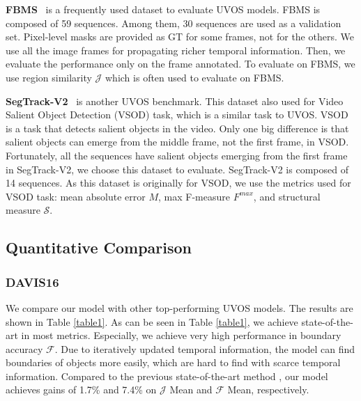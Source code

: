 \documentclass[letterpaper]{article} \usepackage{aaai22}  \usepackage{times}  \usepackage{helvet}  \usepackage{courier}  \usepackage[hyphens]{url}  \usepackage{graphicx} \urlstyle{rm} \def\UrlFont{\rm}  \usepackage{natbib}  \usepackage{caption} \DeclareCaptionStyle{ruled}{labelfont=normalfont,labelsep=colon,strut=off} \frenchspacing  \setlength{\pdfpagewidth}{8.5in}  \setlength{\pdfpageheight}{11in}  \usepackage{algorithm}
\renewcommand{\paragraph}[1]{\vspace{1mm}\noindent\textbf{#1}}
\begin{document}
\paragraph{FBMS}~\citep{ochs2013segmentation} is a frequently used dataset to evaluate UVOS models. FBMS is composed of 59 sequences. Among them, 30 sequences are used as a validation set. Pixel-level masks are provided as GT for some frames, not for the others. We use all the image frames for propagating richer temporal information. Then, we evaluate the performance only on the frame annotated. To evaluate on FBMS, we use region similarity $\mathcal{J}$ which is often used to evaluate on FBMS. 

\paragraph{SegTrack-V2}~\citep{li2013video} is another UVOS benchmark.
This dataset also used for Video Salient Object Detection (VSOD) task, which is a similar task to UVOS. VSOD is a task that detects salient objects in the video. Only one big difference is that salient objects can emerge from the middle frame, not the first frame, in VSOD. Fortunately, all the sequences have salient objects emerging from the first frame in SegTrack-V2, we choose this dataset to evaluate. SegTrack-V2 is composed of 14 sequences. As this dataset is originally for VSOD, we use the metrics used for VSOD task: mean absolute error $M$, max F-measure $F^{max}$, and structural measure $\mathcal{S}$. 

\subsection{Quantitative Comparison}

\subsubsection{DAVIS16}

We compare our model with other top-performing UVOS models. The results are shown in Table \ref{table1}. As can be seen in Table \ref{table1}, we achieve state-of-the-art in most metrics. Especially, we achieve very high performance in boundary accuracy $\mathcal{F}$. Due to iteratively updated temporal information, the model can find boundaries of objects more easily, which are hard to find with scarce temporal information. Compared to the previous state-of-the-art method \citep{liu2020f2net}, our model achieves gains of 1.7\% and 7.4\% on $\mathcal{J}$ Mean and $\mathcal{F}$ Mean, respectively.
\end{document}
